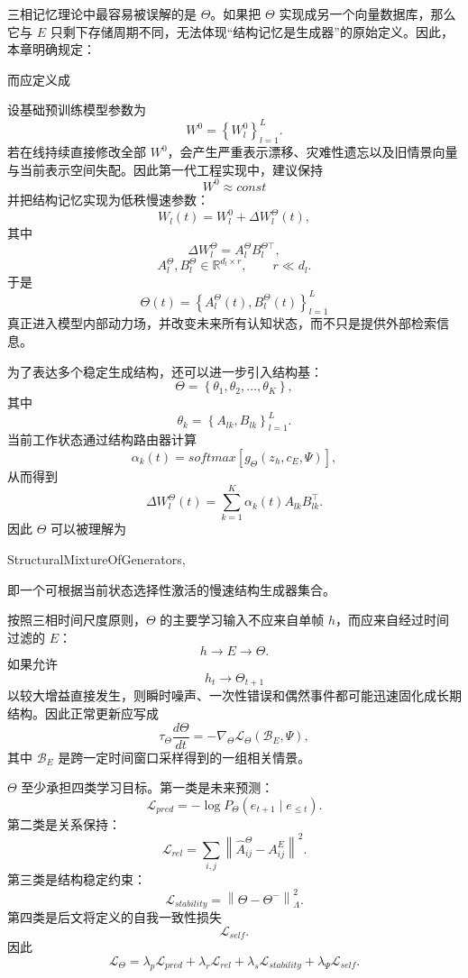 三相记忆理论中最容易被误解的是 $\Theta$。如果把 $\Theta$ 实现成另一个向量数据库，那么它与 $E$ 只剩下存储周期不同，无法体现“结构记忆是生成器”的原始定义。因此，本章明确规定：
\begin{statementbox}
\centering
{}
\end{statementbox}
而应定义成
\begin{statementbox}
\centering
{}
\end{statementbox}

设基础预训练模型参数为
\[
W^0
=
\left\{
W_l^0
\right\}_{l=1}^{L}.
\]
若在线持续直接修改全部 $W^0$，会产生严重表示漂移、灾难性遗忘以及旧情景向量与当前表示空间失配。因此第一代工程实现中，建议保持
\[
W^0\approx const
\]
并把结构记忆实现为低秩慢速参数：
\[
W_l(t)
=
W_l^0
+
\Delta W_l^\Theta(t),
\]
其中
\[
\Delta W_l^\Theta
=
A_l^\Theta
B_l^{\Theta\top},
\]
\[
A_l^\Theta,B_l^\Theta
\in
\mathbb{R}^{d_l\times r},
\qquad
r\ll d_l.
\]
于是
\[
\Theta(t)
=
\left\{
A_l^\Theta(t),
B_l^\Theta(t)
\right\}_{l=1}^{L}
\]
真正进入模型内部动力场，并改变未来所有认知状态，而不只是提供外部检索信息。

为了表达多个稳定生成结构，还可以进一步引入结构基：
\[
\Theta
=
\left\{
\theta_1,\theta_2,\ldots,\theta_K
\right\},
\]
其中
\[
\theta_k
=
\left\{
A_{lk},B_{lk}
\right\}_{l=1}^{L}.
\]
当前工作状态通过结构路由器计算
\[
\alpha_k(t)
=
softmax
\left[
g_\Theta
\left(
z_h,c_E,\Psi
\right)
\right],
\]
从而得到
\[
\Delta W_l^\Theta(t)
=
\sum_{k=1}^{K}
\alpha_k(t)
A_{lk}B_{lk}^{\top}.
\]
因此 $\Theta$ 可以被理解为
\begin{statementbox}
StructuralMixtureOfGenerators,
\end{statementbox}
即一个可根据当前状态选择性激活的慢速结构生成器集合。

按照三相时间尺度原则，$\Theta$ 的主要学习输入不应来自单帧 $h$，而应来自经过时间过滤的 $E$：
\[
\boxed{
h
\rightarrow
E
\rightarrow
\Theta.
}
\]
如果允许
\[
h_t
\rightarrow
\Theta_{t+1}
\]
以较大增益直接发生，则瞬时噪声、一次性错误和偶然事件都可能迅速固化成长期结构。因此正常更新应写成
\[
\tau_\Theta
\frac{d\Theta}{dt}
=
-
\nabla_\Theta
\mathcal{L}_\Theta
\left(
\mathcal{B}_E,\Psi
\right),
\]
其中 $\mathcal{B}_E$ 是跨一定时间窗口采样得到的一组相关情景。

$\Theta$ 至少承担四类学习目标。第一类是未来预测：
\[
\mathcal{L}_{pred}
=
-
\log
P_\Theta
\left(
e_{t+1}
\mid
e_{\leq t}
\right).
\]
第二类是关系保持：
\[
\mathcal{L}_{rel}
=
\sum_{i,j}
\left\|
\widehat{A}_{ij}^\Theta
-
A_{ij}^E
\right\|^2.
\]
第三类是结构稳定约束：
\[
\mathcal{L}_{stability}
=
\left\|
\Theta-\Theta^{-}
\right\|_\Lambda^2.
\]
第四类是后文将定义的自我一致性损失
\[
\mathcal{L}_{self}.
\]
因此
\[
\mathcal{L}_\Theta
=
\lambda_p\mathcal{L}_{pred}
+
\lambda_r\mathcal{L}_{rel}
+
\lambda_s\mathcal{L}_{stability}
+
\lambda_\Psi\mathcal{L}_{self}.
\]

